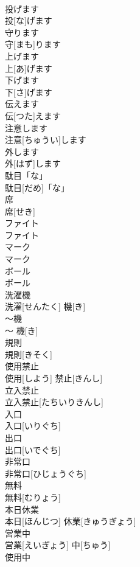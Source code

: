 \documentclass[8pt]{extreport}
\begin{document}
\begin{CJK}{UTF8}{min}
\\	投げます	
\\	投[な]げます	
\\	守ります	
\\	守[まも]ります	
\\	上げます	
\\	上[あ]げます	
\\	下げます	
\\	下[さ]げます	
\\	伝えます	
\\	伝[つた]えます	
\\	注意します
\\	注意[ちゅうい]します
\\	外します	
\\	外[はず]します	
\\	駄目「な」	
\\	駄目[だめ]「な」	
\\	席	
\\	席[せき]	
\\	ファイト	
\\	ファイト	
\\	マーク	
\\	マーク	
\\	ボール	
\\	ボール	
\\	洗濯機	
\\	洗濯[せんたく] 機[き]	
\\	〜機	
\\	〜 機[き]	
\\	規則	
\\	規則[きそく]	
\\	使用禁止	
\\	使用[しよう] 禁止[きんし]	
\\	立入禁止	
\\	立入禁止[たちいりきんし]	
\\	入口	
\\	入口[いりぐち]	
\\	出口	
\\	出口[いでぐち]	
\\	非常口	
\\	非常口[ひじょうぐち]	
\\	無料	
\\	無料[むりょう]	
\\	本日休業	
\\	本日[ほんじつ] 休業[きゅうぎょう]	
\\	営業中	
\\	営業[えいぎょう] 中[ちゅう]	
\\	使用中	

\end{CJK}
\end{document}

